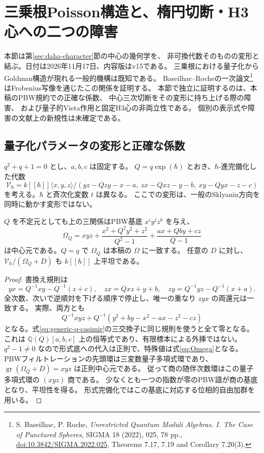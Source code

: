 \section{三乗根Poisson構造と、楕円切断・H3心への二つの障害}
\label{sec:root-poisson-orders}
本節は第\ref{sec:daha-character}節の中心の幾何学を、
非可換代数そのものの変形と結ぶ。日付は2026年11月17日、内容版はv15である。
三乗根における量子化からGoldman構造が現れる一般的機構は既知である。
Baseilhac--Rocheの一次論文\footnote{S. Baseilhac, P. Roche,
\emph{Unrestricted Quantum Moduli Algebras. I. The Case of Punctured Spheres},
SIGMA 18 (2022), 025, 78 pp.,
\href{https://doi.org/10.3842/SIGMA.2022.025}{doi:10.3842/SIGMA.2022.025},
Theorems 7.17, 7.19 and Corollary 7.20(3).}
はFrobenius写像を通じたこの関係を証明する。
本節で独立に証明するのは、本稿のPBW規約での正確な係数、
中心三次切断をその変形に持ち上げる際の障害、
および量子的Vieta作用と固定H3心の非両立性である。
個別の表示式や障害の文献上の新規性は未確定である。

\subsection{量子化パラメータの変形と正確な係数}
$q^2+q+1=0$ とし、$a,b,c$ は固定する。
$Q=q\exp(\hbar)$ とおき、$\hbar$-進完備化した代数
\[
 \mathcal V_\hbar=k[[\hbar]]\langle x,y,z\rangle/
 (yz-Qzy-x-a,\ zx-Qxz-y-b,\ xy-Qyx-z-c)
\]
を考える。$\hbar$ と斉次化変数 $t$ は異なる。
ここでの変形は、一般のSklyanin方向を同時に動かす変形ではない。

\begin{lemma}[全係数PBWと持ち上がるCasimir]
\label{lem:generic-q-casimir}
$Q$ を不定元としても上の三関係はPBW基底 $x^iy^jz^k$ を与え、
\begin{equation}\label{eq:generic-q-casimir}
 \Omega_Q=xyz+\frac{x^2+Q^2y^2+z^2}{Q^2-1}
       +\frac{ax+Qby+cz}{Q-1}
\end{equation}
は中心元である。$Q=q$ で $\Omega_Q$ は本稿の $\Omega$ に一致する。
任意の $D$ に対し、$\mathcal V_\hbar/(\Omega_Q+D)$ も
$k[[\hbar]]$ 上平坦である。
\end{lemma}
\begin{proof}
書換え規則は
\[
 yx=Q^{-1}xy-Q^{-1}(z+c),\quad
 zx=Qxz+y+b,\quad
 zy=Q^{-1}yz-Q^{-1}(x+a).
\]
全次数、次いで逆順対を下げる順序で停止し、唯一の重なり $zyx$ の両還元は一致する。
実際、両方とも
\[
 Q^{-1}xyz+Q^{-1}(y^2+by-x^2-ax-z^2-cz)
\]
となる。式\eqref{eq:generic-q-casimir}の三交換子に同じ規則を使うと全て零となる。
これは $\mathbb Q(Q)[a,b,c]$ 上の恒等式であり、有限標本による外挿ではない。
$q^2-1\ne0$ なので形式底への代入は正則で、特殊値は式\eqref{eq:Omega}となる。
PBWフィルトレーションの先頭環は三変数量子多項式環であり、
$\operatorname{gr}(\Omega_Q+D)=xyz$ は正則中心元である。
従って商の随伴次数環はこの量子多項式環の $(xyz)$ 商である。
少なくとも一つの指数が零のPBW語が商の基底となり、平坦性を得る。
形式完備化ではこの基底に対応する位相的自由加群を用いる。
\end{proof}


